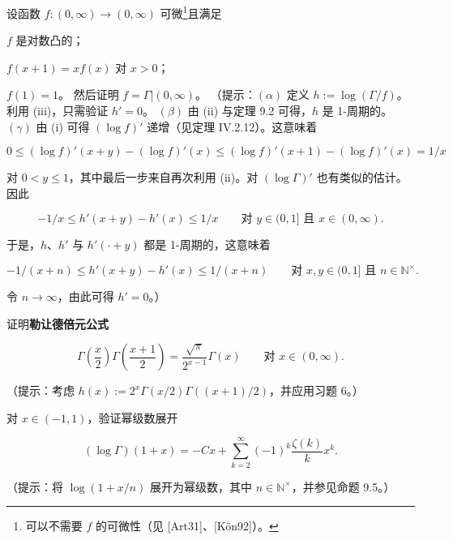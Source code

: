 \begin{exercises}
设函数 $ f : (0,\infty) \to (0,\infty) $ 可微\footnote{可以不需要 $ f $ 的可微性（见 [Art31]、[Kön92]）。}且满足

\begin{subitems}
\item

$ f $ 是对数凸的；

\item

$ f(x+1) = xf(x) $ 对 $ x > 0 $；

\item

$ f(1) = 1 $。
然后证明 $ f = \Gamma|(0,\infty) $。
（提示：$ (\alpha) $ 定义 $ h := \log(\Gamma/f) $。利用 (iii)，只需验证 $ h' = 0 $。
$ (\beta) $ 由 (ii) 与定理 9.2 可得，$ h $ 是 1-周期的。
$ (\gamma) $ 由 (i) 可得 $ (\log f)' $ 递增（见定理 IV.2.12）。这意味着

\[
0 \le (\log f)'(x+y) - (\log f)'(x) \le (\log f)'(x+1) - (\log f)'(x) = 1/x
\]

对 $ 0 < y \le 1 $，其中最后一步来自再次利用 (ii)。对 $ (\log \Gamma)' $ 也有类似的估计。因此

\[
-1/x \le h'(x+y) - h'(x) \le 1/x \qquad \text{对 } y \in (0,1] \text{ 且 } x \in (0,\infty) .
\]

于是，$ h $、$ h' $ 与 $ h'(\cdot + y) $ 都是 1-周期的，这意味着

\[
-1/(x+n) \le h'(x+y) - h'(x) \le 1/(x+n) \qquad \text{对 } x, y \in (0,1] \text{ 且 } n \in \mathbb{N}^{\times} .
\]

令 $ n \to \infty $，由此可得 $ h' = 0 $。）

\end{subitems}

\item

证明\textbf{勒让德倍元公式}

\[
\Gamma\left(\frac{x}{2}\right)\Gamma\left(\frac{x+1}{2}\right) = \frac{\sqrt{\pi}}{2^{x-1}}\Gamma(x) \qquad \text{对 } x \in (0,\infty) .
\]

（提示：考虑 $ h(x) := 2^{x}\Gamma(x/2)\Gamma((x+1)/2) $，并应用习题 6。）

\item

对 $ x \in (-1,1) $，验证幂级数展开

\[
(\log\Gamma)(1+x) = -Cx + \sum_{k=2}^{\infty}(-1)^{k}\frac{\zeta(k)}{k}x^{k} .
\]

（提示：将 $ \log(1+x/n) $ 展开为幂级数，其中 $ n \in \mathbb{N}^{\times} $，并参见命题 9.5。）


\end{exercises}
